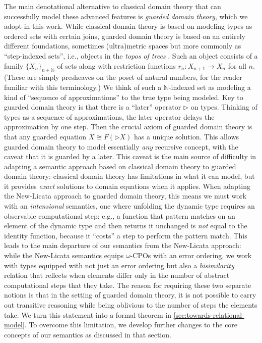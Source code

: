 The main denotational alternative to classical domain theory that can
successfully model these advanced features is \emph{guarded domain
theory}, which we adopt in this work. While classical domain theory is
based on modeling types as ordered sets with certain joins, guarded
domain theory is based on an entirely different foundations, sometimes
(ultra)metric spaces but more commonly as ``step-indexed sets'', i.e.,
objects in the \emph{topos of trees} \cite{birkedal-mogelberg-schwinghammer-stovring2011}. 
Such an object consists of a family $\{X_n\}_{n \in \mathbb{N}}$ of sets
along with restriction functions $r_n : X_{n+1} \to X_n$ for all $n$.
(These are simply presheaves on the poset of natural numbers, for the
reader familiar with this terminology.)
We think of such a $\mathbb{N}$-indexed set as modeling a kind of 
``sequence of approximations'' to the true type being modeled.
%
Key to guarded domain theory is that there is a ``later'' operator
$\triangleright$ on types. Thinking of types as a sequence of
approximations, the later operator delays the approximation by one
step. Then the crucial axiom of guarded domain theory is that any
guarded equation $X \cong F(\triangleright X)$ has a unique
solution. This allows guarded domain theory to model essentially
\emph{any} recursive concept, with the caveat that it is guarded by a
later.
%
This caveat is the main source of difficulty in adapting a semantic
approach based on classical domain theory to guarded domain theory:
classical domain theory has limitations in what it can model, but it
provides \emph{exact} solutions to domain equations when it
applies. When adapting the New-Licata approach to guarded domain
theory, this means we must work with an \emph{intensional} semantics,
one where unfolding the dynamic type requires an observable
computational step: e.g., a function that pattern matches on an
element of the dynamic type and then returns it unchanged is
\emph{not} equal to the identity function, because it ``costs'' a step
to perform the pattern match.
%
This leads to the main departure of our semantics from the New-Licata
approach: while the New-Licata semantics equips $\omega$-CPOs with an
error ordering, we work with types equipped with not just an error
ordering but also a \emph{bisimilarity} relation that reflects when
elements differ only in the number of abstract computational steps
that they take.
%
The reason for requiring these two separate notions is that in the setting of
guarded domain theory, it is not possible to carry out transitive reasoning
while being oblivious to the number of steps the elements take. We turn this
statement into a formal theorem in \ref{sec:towards-relational-model}. To overcome
this limitation, we develop further changes to the core concepts of our
semantics as discussed in that section.

